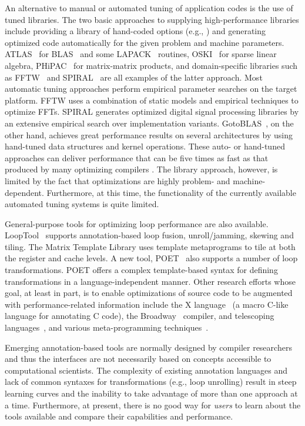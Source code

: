 An alternative to manual or automated tuning of application codes is the use
of tuned libraries. The two basic approaches to supplying high-performance
libraries include providing a library of hand-coded options (e.g.,
\cite{BLAS,ESSL,Goto:2006fk}) and generating optimized code automatically
for the given problem and machine
parameters. ATLAS~\cite{atlas_sc98,WN147} for BLAS~\cite{BLAS} and
some LAPACK~\cite{laug} routines, OSKI~\cite{OSKI} for sparse linear
algebra, PHiPAC~\cite{bilmes97optimizing} for matrix-matrix products,
and domain-specific libraries such as FFTW~\cite{frigo98} and
SPIRAL~\cite{SPIRAL} are all examples of the latter approach. Most
automatic tuning approaches perform empirical parameter searches on
the target platform.  FFTW uses a combination of static models and
empirical techniques to optimize FFTs. SPIRAL generates optimized
digital signal processing libraries by an extensive empirical search
over implementation variants.  GotoBLAS~\cite{Goto:2006fk,Goto:fk}, on
the other hand, achieves great performance results on several
architectures by using hand-tuned data structures and kernel
operations.  These auto- or hand-tuned approaches can deliver
performance that can be five times as fast as that produced by many
optimizing compilers
\cite{WN147}.  The library approach, however, is limited by the fact
that optimizations are highly problem- and
machine-dependent. Furthermore, at this time, the functionality of the
currently available automated tuning systems is quite limited.


General-purpose tools for optimizing loop performance are also
available.  LoopTool~\cite{LoopTool} supports annotation-based loop
fusion, unroll/jamming, skewing and tiling.  The Matrix Template
Library \cite{Siek:1998ys} uses template metaprograms to tile at both
the register and cache levels.  A new tool, POET~\cite{POET} also
supports a number of loop transformations. POET offers a complex
template-based syntax for defining transformations in a
language-independent manner. Other research efforts whose goal, at
least in part, is to enable optimizations of source code to be
augmented with performance-related information include the X
language~\cite{XLanguage} (a macro C-like language for annotating C
code), the Broadway~\cite{broadway} compiler, and telescoping
languages~\cite{telescopingurl,teleoverview,Ken99}, and various
meta-programming
techniques~\cite{veldhuizen95,weise93,kiczales91,chiba95}.

Emerging annotation-based tools are normally designed by compiler researchers
and thus the interfaces are not necessarily based on concepts accessible to
computational scientists. The complexity of existing annotation languages and lack
of common syntaxes for transformations (e.g., loop unrolling) result
in steep learning curves and the inability to take advantage of more than one
approach at a time. Furthermore, at present, there is no good way for
\emph{users} to learn about the tools available and compare their
capabilities and performance.

